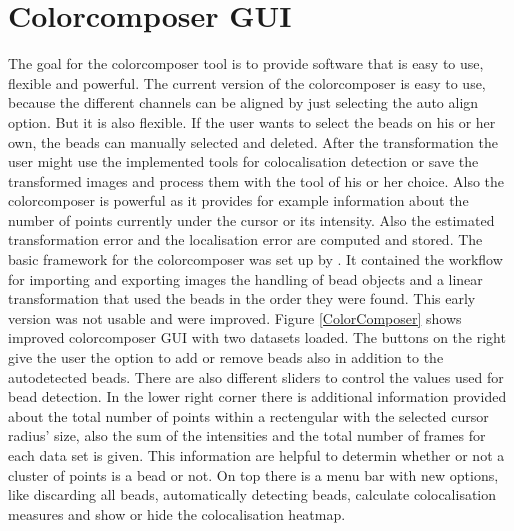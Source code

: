 \section{Colorcomposer GUI}
The goal for the colorcomposer tool is to provide software that is easy to use, flexible and powerful. The current version of the colorcomposer is easy to use, because the different channels can be aligned by just selecting the auto align option.\newline
But it is also flexible. If the user wants to select the beads on his or her own, the beads can manually selected and deleted. After the transformation the user might use the implemented tools for colocalisation detection or save the transformed images and process them with the tool of his or her choice.\newline
Also the colorcomposer is powerful as it provides for example information about the number of points currently under the cursor or its intensity. Also the estimated transformation error and the localisation error are computed and stored.\newline
The basic framework for the colorcomposer was set up by \cite{MAJoachim}. It contained the workflow for importing and exporting images the handling of bead objects and a linear transformation that used the beads in the order they were found. This early version was not usable and were improved.\newline
Figure \ref{ColorComposer} shows improved colorcomposer GUI with two datasets loaded. The buttons on the right give the user the option to add or remove beads also in addition to the autodetected beads. There are also different sliders to control the values used for bead detection. In the lower right corner there is additional information provided about the total number of points within a rectengular with the selected cursor radius' size, also the sum of the intensities and the total number of frames for each data set is given. This information are helpful to determin whether or not a cluster of points is a bead or not.\newline
On top there is a menu bar with new options, like discarding all beads, automatically detecting beads, calculate colocalisation measures and show or hide the colocalisation heatmap.
